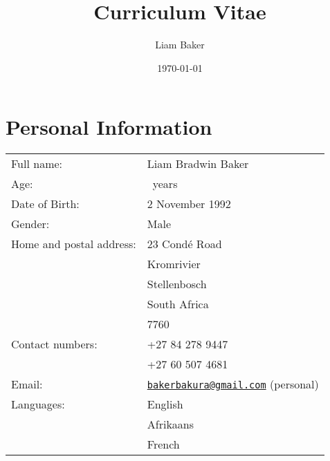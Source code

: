 \documentclass{article}
\author{Liam Baker}
\title{Curriculum Vitae}
\date{\today}
\newcommand{\email}[1]{\href{mailto:#1}{\texttt{#1}}}
\begin{document}
 \maketitle


\section{Personal Information}
\begin{center} \begin{tabular}{ll}
	Full name: 								& Liam Bradwin Baker \\
	Age: 											& \myyears~years \\
	Date of Birth:						& 2 November 1992 \\
	Gender: 									& Male \\
	Home and postal address:	& 23 Condé Road \\
														& Kromrivier \\
														& Stellenbosch \\
														& South Africa \\
														& 7760 \\
	Contact numbers:					& +27 84 278 9447 \\
														& +27 60 507 4681 \\
	Email:										& \email{bakerbakura@gmail.com} (personal)\\
	Languages:								& English \\
														& \footnotesize{Afrikaans} \\
														& \tiny{French} \\
\end{tabular} \end{center}
\end{document}
